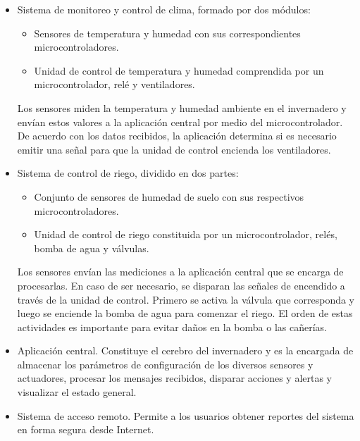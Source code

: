 \begin{itemize}
\item Sistema de monitoreo y control de clima, formado por dos módulos:
\begin{itemize}
\item Sensores de temperatura y humedad con sus correspondientes microcontroladores.
\item Unidad de control de temperatura y humedad comprendida por un microcontrolador, relé y ventiladores. 
\end{itemize}
Los sensores miden la temperatura y humedad ambiente en el invernadero y envían estos valores a la aplicación central por medio del microcontrolador. De acuerdo con los datos recibidos, la aplicación determina si es necesario emitir una señal para que la unidad de control encienda los ventiladores.



\item Sistema de control de riego, dividido en dos partes:
\begin{itemize}
\item Conjunto de sensores de humedad de suelo con sus respectivos microcontroladores.
\item Unidad de control de riego constituida por un microcontrolador, relés, bomba de agua y válvulas.
\end{itemize}

Los sensores envían las mediciones a la aplicación central que se encarga de procesarlas. En caso de ser necesario, se disparan las señales de encendido a través de la unidad de control. Primero se activa la válvula que corresponda y luego se enciende la bomba de agua para comenzar el riego. El orden de estas actividades es importante para evitar daños en la bomba o las cañerías.

\item Aplicación central. Constituye el cerebro del invernadero y es la encargada de almacenar los parámetros de configuración de los diversos sensores y actuadores, procesar los mensajes recibidos, disparar acciones y alertas y visualizar el estado general.

\item Sistema de acceso remoto. Permite a los usuarios obtener reportes del sistema en forma segura desde Internet.   
\end{itemize}



